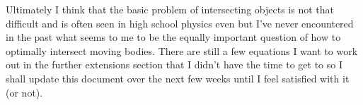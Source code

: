 \documentclass[11pt,english]{article}
\begin{document}
\noindent Ultimately I think that the basic problem of intersecting objects is not that difficult and is often seen in high school physics even but I've never encountered in the past what seems to me to be the equally important question of how to optimally intersect moving bodies. There are still a few equations I want to work out in the further extensions section that I didn't have the time to get to so I shall update this document over the next few weeks until I feel satisfied with it (or not).
\end{document}
